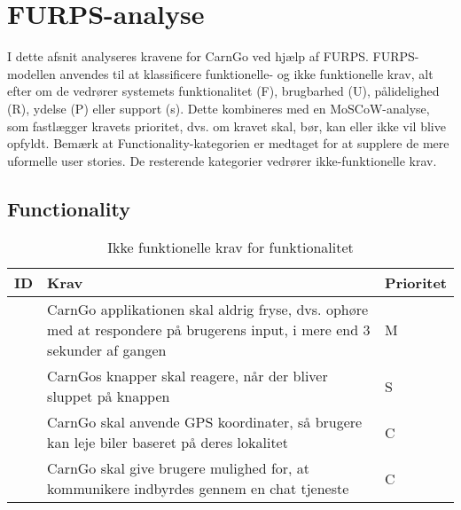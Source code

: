 \documentclass[Kravspecifikation/Kravspec_Main.tex]{subfiles}
\begin{document}
\section{FURPS-analyse}
I dette afsnit analyseres kravene for CarnGo ved hjælp af FURPS. FURPS-modellen anvendes til at klassificere funktionelle- og ikke funktionelle krav, alt efter om de vedrører systemets funktionalitet (F), brugbarhed (U), pålidelighed (R), ydelse (P) eller support (s). Dette kombineres med en MoSCoW-analyse, som fastlægger kravets prioritet, dvs. om kravet skal, bør, kan eller ikke vil blive opfyldt. Bemærk at Functionality-kategorien er medtaget for at supplere de mere uformelle user stories. De resterende kategorier vedrører ikke-funktionelle krav.

\subsection{Functionality}
\begin{table}[H]
\centering
\begin{tabular}{|L{0.1\textwidth}|L{0.6\textwidth}|L{0.15\textwidth}|}
\hline
\textbf{ID} & \textbf{Krav} & \textbf{Prioritet} \\ \hline
\subreq{} & CarnGo applikationen skal aldrig fryse, dvs. ophøre med at respondere på brugerens input, i mere end 3 sekunder af gangen & M \\ \hline
 \subreq{}& CarnGos knapper skal reagere, når der bliver sluppet på knappen & S \\ \hline
 \subreq{}& CarnGo skal anvende GPS koordinater, så brugere kan leje biler baseret på deres lokalitet & C \\ \hline
 \subreq{}& CarnGo skal give brugere mulighed for, at kommunikere indbyrdes gennem en chat tjeneste & C \\ \hline
\end{tabular}
\caption{Ikke funktionelle krav for funktionalitet}
\label{tab:funktionalitet}
\end{table}
\end{document}
